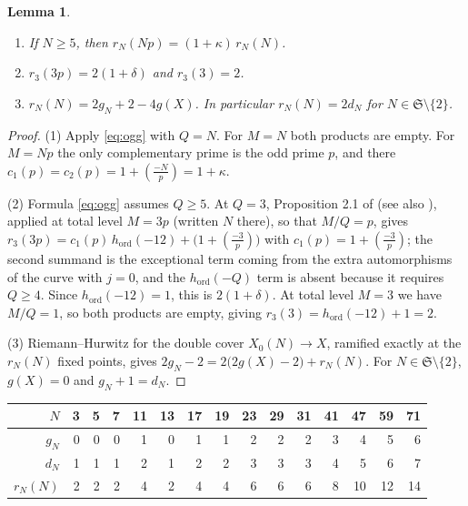 \documentclass[11pt,a4paper]{article}
\newtheorem{lemma}[theorem]{Lemma}
\theoremstyle{remark}\newtheorem{remark}[theorem]{Remark}
\numberwithin{equation}{section}
\newcommand{\leg}[2]{\left(\frac{#1}{#2}\right)}
\newcommand{\ho}{h_{\mathrm{ord}}}
\begin{document}
	\begin{lemma}\label{lem:fixedN}
		\begin{enumerate}
			\item If $N\geq5$, then $r_N(Np)=(1+\kappa)\,r_N(N)$.
			\item $r_3(3p)=2(1+\delta)$ and $r_3(3)=2$.
			\item $r_N(N)=2g_N+2-4g(X)$. In particular $r_N(N)=2d_N$ for $N\in\mathfrak S\setminus\{2\}$.
		\end{enumerate}
	\end{lemma}
	\begin{proof}
		(1) Apply \eqref{eq:ogg} with $Q=N$. For $M=N$ both products are empty. For $M=Np$ the only complementary prime is the odd prime $p$, and there $c_1(p)=c_2(p)=1+\leg{-N}{p}=1+\kappa$.
		
		(2) Formula \eqref{eq:ogg} assumes $Q\geq5$. At $Q=3$, Proposition 2.1 of \cite{IJK} (see also \cite[Remark 2]{FH}), applied at total level $M=3p$ (written $N$ there), so that $M/Q=p$, gives $r_3(3p)=c_1(p)\,\ho(-12)+\bigl(1+\leg{-3}{p}\bigr)$ with $c_1(p)=1+\leg{-3}{p}$; the second summand is the exceptional term coming from the extra automorphisms of the curve with $j=0$, and the $\ho(-Q)$ term is absent because it requires $Q\geq4$. Since $\ho(-12)=1$, this is $2(1+\delta)$. At total level $M=3$ we have $M/Q=1$, so both products are empty, giving $r_3(3)=\ho(-12)+1=2$.
		
		(3) Riemann--Hurwitz for the double cover $X_0(N)\to X$, ramified exactly at the $r_N(N)$ fixed points, gives $2g_N-2=2\bigl(2g(X)-2\bigr)+r_N(N)$. For $N\in\mathfrak S\setminus\{2\}$, $g(X)=0$ and $g_N+1=d_N$.
	\end{proof}
	
	\begin{center}
		\begin{tabular}{rrrrrrrrrrrrrrr}\toprule
			$N$ & 3 & 5 & 7 & 11 & 13 & 17 & 19 & 23 & 29 & 31 & 41 & 47 & 59 & 71\\\midrule
			$g_N$ & 0 & 0 & 0 & 1 & 0 & 1 & 1 & 2 & 2 & 2 & 3 & 4 & 5 & 6\\
			$d_N$ & 1 & 1 & 1 & 2 & 1 & 2 & 2 & 3 & 3 & 3 & 4 & 5 & 6 & 7\\
			$r_N(N)$ & 2 & 2 & 2 & 4 & 2 & 4 & 4 & 6 & 6 & 6 & 8 & 10 & 12 & 14\\\bottomrule
		\end{tabular}
	\end{center}
	
\end{document}
